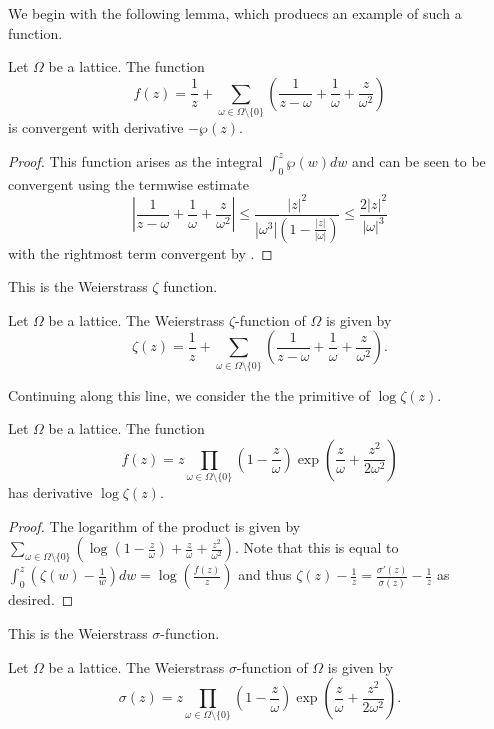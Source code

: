 We begin with the following lemma, which produecs an example of such a function. 
\begin{lemma}\label{lem: Weierstrass zeta function}
    Let $\Omega$ be a lattice. The function 
    $$f(z)=\frac{1}{z}+\sum_{\omega\in\Omega\setminus\{0\}}\left(\frac{1}{z-\omega}+\frac{1}{\omega}+\frac{z}{\omega^{2}}\right)$$
    is convergent with derivative $-\wp(z)$. 
\end{lemma}
\begin{proof}
    This function arises as the integral $\int_{0}^{z}\wp(w)dw$ and can be seen to be convergent using the termwise estimate 
    $$\left|\frac{1}{z-\omega}+\frac{1}{\omega}+\frac{z}{\omega^{2}}\right|\leq\frac{|z|^{2}}{|\omega^{3}|\left(1-\frac{|z|}{|\omega|}\right)}\leq\frac{2|z|^{2}}{|\omega|^{3}}$$
    with the rightmost term convergent by . 
\end{proof}
This is the Weierstrass $\zeta$ function. 
\begin{definition}\label{def: Weierstrass zeta function}
    Let $\Omega$ be a lattice. The Weierstrass $\zeta$-function of $\Omega$ is given by 
    $$\zeta(z)=\frac{1}{z}+\sum_{\omega\in\Omega\setminus\{0\}}\left(\frac{1}{z-\omega}+\frac{1}{\omega}+\frac{z}{\omega^{2}}\right).$$
\end{definition}
Continuing along this line, we consider the the primitive of $\log\zeta(z)$. 
\begin{lemma}\label{lem: Weierstrass sigma function}
    Let $\Omega$ be a lattice. The function 
    $$f(z)=z\prod_{\omega\in\Omega\setminus\{0\}}\left(1-\frac{z}{\omega}\right)\exp\left(\frac{z}{\omega}+\frac{z^{2}}{2\omega^{2}}\right)$$
    has derivative $\log\zeta(z)$. 
\end{lemma}
\begin{proof}
    The logarithm of the product is given by $\sum_{\omega\in\Omega\setminus\{0\}}\left(\log\left(1-\frac{z}{\omega}\right)+\frac{z}{\omega}+\frac{z^{2}}{\omega^{2}}\right).$ Note that this is equal to $\int_{0}^{z}(\zeta(w)-\frac{1}{w})dw=\log\left(\frac{f(z)}{z}\right)$ and thus $\zeta(z)-\frac{1}{z}=\frac{\sigma'(z)}{\sigma(z)}-\frac{1}{z}$ as desired. 
\end{proof}
This is the Weierstrass $\sigma$-function. 
\begin{definition}\label{def: Weierstrass sigma function}
    Let $\Omega$ be a lattice. The Weierstrass $\sigma$-function of $\Omega$ is given by 
    $$\sigma(z)=z\prod_{\omega\in\Omega\setminus\{0\}}\left(1-\frac{z}{\omega}\right)\exp\left(\frac{z}{\omega}+\frac{z^{2}}{2\omega^{2}}\right).$$
\end{definition}
